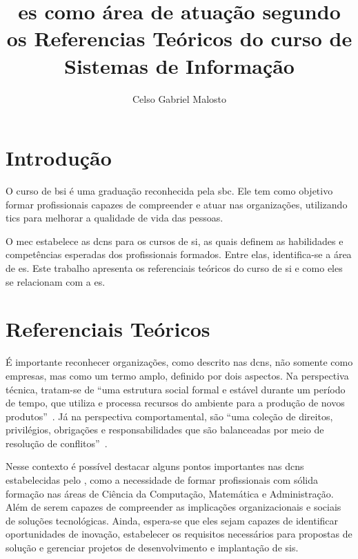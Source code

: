 \documentclass[12pt]{article}
\title{\gls{es} como área de atuação segundo os Referencias Teóricos do curso de Sistemas de Informação}
\author{Celso Gabriel Malosto\inst{1}}
\begin{document}
\maketitle

\begin{abstract}

\end{abstract}

\begin{resumo}

\end{resumo}

\section{Introdução}%
\label{sec:introducao}

O curso de \gls{bsi} é uma graduação reconhecida pela \gls{sbc}.
Ele tem como objetivo formar profissionais capazes de compreender e atuar nas organizações, utilizando \glspl{tic} para melhorar a qualidade de vida das pessoas.

O \gls{mec} estabelece as \glspl{dcn} para os cursos de \gls{si}, as quais definem as habilidades e competências esperadas dos profissionais formados.
Entre elas, identifica-se a área de \acrfull{es}.
Este trabalho apresenta os referenciais teóricos do curso de \gls{si} e como eles se relacionam com a \gls{es}.

\section{Referenciais Teóricos}%
\label{sec:referenciais_teoricos}

É importante reconhecer organizações, como descrito nas \glspl{dcn}, não somente como empresas, mas como um termo amplo, definido por dois aspectos.
Na perspectiva técnica, tratam-se de ``uma estrutura social formal e estável durante um período de tempo, que utiliza e processa recursos do ambiente para a produção de novos produtos''~\cite{zorzo2017referenciais}.
Já na perspectiva comportamental, são ``uma coleção de direitos, privilégios, obrigações e responsabilidades que são balanceadas por meio de resolução de conflitos''~\cite{zorzo2017referenciais}.

Nesse contexto é possível destacar alguns pontos importantes nas \glspl{dcn} estabelecidas pelo \textcite{mec2016dcn}, como a necessidade de formar profissionais com sólida formação nas áreas de Ciência da Computação, Matemática e Administração.
Além de serem capazes de compreender as implicações organizacionais e sociais de soluções tecnológicas.
Ainda, espera-se que eles sejam capazes de identificar oportunidades de inovação, estabelecer os requisitos necessários para propostas de solução e gerenciar projetos de desenvolvimento e implantação de \glspl{si}.
\end{document}
